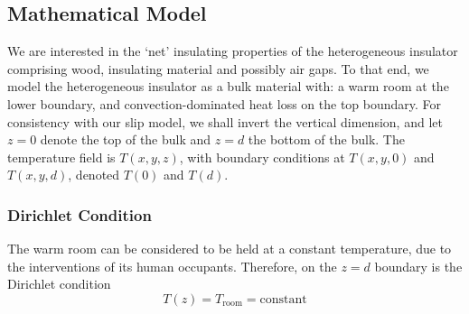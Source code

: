 \documentclass[a4paper]{report}
\newcommand{\Tr}{\ensuremath{T_{\mathrm{room}}}}
\begin{document}
\begin{center}
\end{center}

\subsection*{Mathematical Model}

We are interested in the `net' insulating properties of the heterogeneous insulator comprising wood, insulating material and possibly air gaps.  To that end, we model the heterogeneous insulator as a bulk material
with: a warm room at the lower boundary, and convection-dominated heat loss on the top boundary.  For consistency with our slip model, we shall invert the vertical dimension, and let $z=0$ denote the top of the bulk and $z=d$ the bottom of the bulk.  The temperature field is $T(x,y,z)$, with boundary conditions at $T(x,y,0)$ and $T(x,y,d)$, denoted $T(0)$ and $T(d)$.

\subsubsection*{Dirichlet Condition}

The warm room can be considered to be held at a constant temperature, due to the interventions of its human occupants.  Therefore, on the $z=d$ boundary is the Dirichlet condition
\begin{equation}
T(z) = \Tr = \text{constant}
\end{equation}
\end{document}

